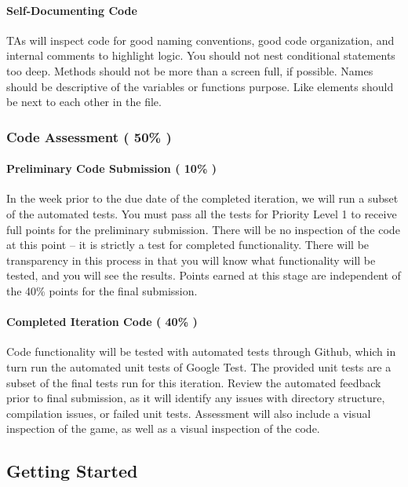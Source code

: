 \paragraph*{Self-\/\+Documenting Code}

T\+As will inspect code for good naming conventions, good code organization, and internal comments to highlight logic. You should not nest conditional statements too deep. Methods should not be more than a screen full, if possible. Names should be descriptive of the variable\textquotesingle{}s or function\textquotesingle{}s purpose. Like elements should be next to each other in the file.

\subsubsection*{Code Assessment ( 50\% )}

\paragraph*{Preliminary Code Submission ( 10\% )}

In the week prior to the due date of the completed iteration, we will run a subset of the automated tests. You must pass all the tests for Priority Level 1 to receive full points for the preliminary submission. There will be no inspection of the code at this point -- it is strictly a test for completed functionality. There will be transparency in this process in that you will know what functionality will be tested, and you will see the results. Points earned at this stage are independent of the 40\% points for the final submission.

\paragraph*{Completed Iteration Code ( 40\% )}

Code functionality will be tested with automated tests through Github, which in turn run the automated unit tests of Google Test. The provided unit tests are a subset of the final tests run for this iteration. Review the automated feedback prior to final submission, as it will identify any issues with directory structure, compilation issues, or failed unit tests. Assessment will also include a visual inspection of the game, as well as a visual inspection of the code.





\subsection*{Getting Started}

